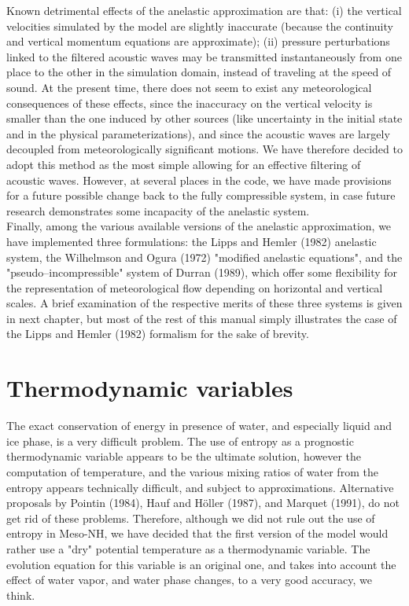 Known detrimental effects of the anelastic approximation are that: (i)
the vertical velocities simulated by the model are slightly inaccurate
(because the continuity and vertical momentum equations are approximate);
(ii) pressure
perturbations linked to the filtered acoustic waves may be transmitted
instantaneously from one place to the other in the simulation domain, instead
of traveling at the speed of sound. At the present time, there does not
seem to exist any meteorological consequences of these effects, since
the inaccuracy on the vertical velocity is smaller than the one induced
by other sources (like uncertainty in the initial state and in the physical
parameterizations), and since the acoustic waves are largely decoupled
from meteorologically significant motions. We have therefore decided to
adopt this method as the most simple allowing for an effective filtering of
acoustic waves. However, at several places in the code,
we have made provisions for a future possible change back to the fully
compressible system, in case future research demonstrates some incapacity
of the anelastic system.
\\

Finally, among the various available versions of the anelastic approximation, we have
implemented three formulations: the Lipps and Hemler (1982) anelastic system,
the Wilhelmson and Ogura (1972) "modified anelastic equations", and the "pseudo--incompressible"
system of Durran (1989), which offer some flexibility for the representation of meteorological
flow depending on horizontal and vertical scales. A brief examination of the respective merits
of these three systems is given in next chapter, but most of the rest of this manual simply
illustrates the case of the Lipps and Hemler (1982) formalism for the sake of brevity.

\section{Thermodynamic variables}

The exact conservation of energy in presence of water, and especially liquid
and ice phase, is a very difficult problem. The use of entropy as a prognostic
thermodynamic variable appears to be the ultimate solution, however the
computation of temperature, and the various mixing ratios of water from the
entropy appears technically difficult, and subject to approximations.
Alternative proposals by Pointin (1984), Hauf and H\"oller (1987), and
Marquet (1991), do not get rid of these problems. Therefore, although
we did not rule out the use of entropy in Meso-NH, we have decided that the
first version of the model would rather use a "dry" potential temperature as a
thermodynamic variable. The evolution
equation for this variable is an original one,
and takes into account the effect of water vapor, and water phase changes,
to a very good accuracy, we think.

